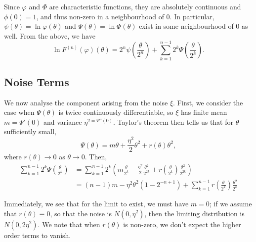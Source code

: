 \documentclass{article}
\theoremstyle{remark}
\theoremstyle{definition}
\begin{document}
Since $\varphi$ and $\Phi$ are characteristic functions, they are absolutely continuous and $\phi(0) = 1$, and thus non-zero in a neighbourhood of 0. In particular, $\psi(\theta) = \ln{\varphi}(\theta)$ and $\Psi(\theta) = \ln{\Phi(\theta)}$ exist in some neighbourhood of 0 as well.  From the above, we have
\[
	\ln{F^{(n)}(\varphi)(\theta)} = {\textstyle 2^{n} \psi\left(\frac{\theta}{2^{n}}\right)} 
		+ \sum_{k=1}^{n-1}  {\textstyle 2^{k} \Psi\left(\frac{\theta}{2^{k}}\right)}.
\]

\subsection{Noise Terms}

We now analyse the component arising from the noise $\xi$.  First, we consider the case when $\Psi(\theta)$ is twice continuously differentiable, so $\xi$ has finite mean $m = \Psi'(0)$ and variance $\eta^{2 = \Psi''(0)}$.   Taylor's theorem then tells us that for $\theta$ sufficiently small, 
\[
	\Psi(\theta) = m\theta + \frac{\eta^{2}}{2} \theta^{2} + r(\theta)\theta^{2},
\]
where $r(\theta) \to 0$ as $\theta \to 0$.  Then,
\begin{align*}
	 \sum_{k=1}^{n-1}  {\textstyle 2^{k} \Psi\left(\frac{\theta}{2^{k}}\right)}
	 &=  \sum_{k=1}^{n-1} 2^{k} {\textstyle \left(m \frac{\theta}{2^{k}} - \frac{\eta^{2}}{2}  \frac{\theta^{2}}{2^{2k}}
		+ r\left(\frac{\theta}{2^{k}}\right)\frac{\theta^{2}}{2^{2k}}\right)}\\
	&= (n-1) m - \eta^{2} \theta^{2} (1 - 2^{-n+1}) 
		+ \sum_{k=1}^{n-1} {\textstyle r\left(\frac{\theta}{2^{k}}\right)\frac{\theta^{2}}{2^{k}}}
 \end{align*}

Immediately, we see that for the limit to exist, we must have $m = 0$; if we assume that $r(\theta) \equiv 0$, so that the noise is $N(0,\eta^{2})$, then the limiting distribution is $N(0,2\eta^{2})$. We note that when  $r(\theta)$ is non-zero, we don't expect the higher order terms to vanish.
\end{document}
